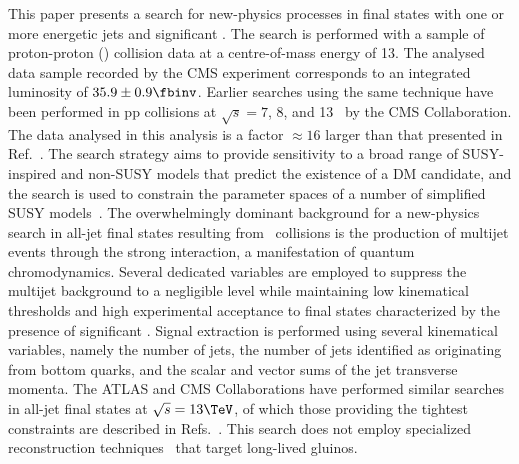 This paper presents a search for new-physics processes in final states
with one or more energetic jets and significant \ptvecmiss. The search
is performed with a sample of proton-proton (\Pp\Pp) collision data at
a centre-of-mass energy of 13\TeV. The analysed data sample recorded
by the CMS experiment corresponds to an integrated luminosity of $35.9
\pm 0.9\fbinv$. Earlier searches using the same technique have been
performed in pp collisions at $\sqrt{s} = 7$, 8, and
13\TeV~\cite{RA1Paper, RA1Paper2011, RA1Paper2011FULL, RA1Paper2012,
  RA1Parked, Khachatryan:2016dvc} by the CMS Collaboration. The data
analysed in this analysis is a factor ${\approx}16$ larger than that
presented in Ref.~\cite{Khachatryan:2016dvc}. The search strategy aims
to provide sensitivity to a broad range of SUSY-inspired and non-SUSY
models that predict the existence of a DM candidate, and the search is
used to constrain the parameter spaces of a number of simplified SUSY
models~\cite{Alwall:2008ag, Alwall:2008va, sms}. The overwhelmingly
dominant background for a new-physics search in all-jet final states
resulting from \Pp\Pp\ collisions is the production of multijet events
through the strong interaction, a manifestation of quantum
chromodynamics. Several dedicated variables are employed to suppress
the multijet background to a negligible level while maintaining low
kinematical thresholds and high experimental acceptance to final
states characterized by the presence of significant \ptvecmiss. Signal
extraction is performed using several kinematical variables, namely
the number of jets, the number of jets identified as originating from
bottom quarks, and the scalar and vector sums of the jet transverse
momenta. The ATLAS and CMS Collaborations have performed similar
searches in all-jet final states at $\sqrt{s} = 13\TeV$, of which
those providing the tightest constraints are described in
Refs.~\cite{Aaboud:2016zdn, Sirunyan:2017cwe, Sirunyan:2017kqq}. This
search does not employ specialized reconstruction
techniques~\cite{Aaboud:2017iio, Aaboud:2016uth, Aaboud:2016dgf,
  Aad:2013gva, Khachatryan:2016sfv, Khachatryan:2015jha} that target
long-lived gluinos.


